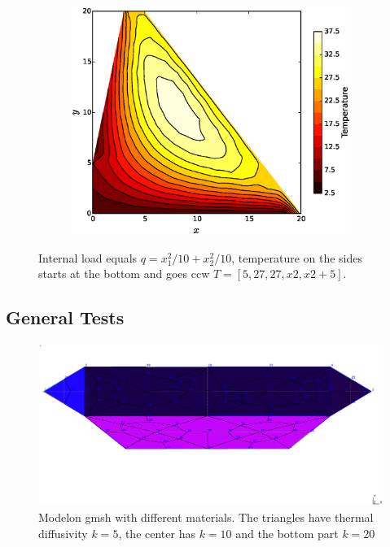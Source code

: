 \documentclass[10pt, a4paper]{article}
\begin{document}
\begin{figure}[H]
	\begin{subfigure}[H]{0.33\textwidth}
		\includegraphics[width=\textwidth]{fig/exdam4_3.eps}
		\caption{}
		\label{fig:3}
	\end{subfigure}
	\caption{Internal load equals $q=x_1^2/10 + x_2^2/10$, temperature on the sides starts at the bottom and goes ccw $T=[5, 27, 27, x2, x2+5]$.}
	\label{fig:3_1}
\end{figure}


\subsection{General Tests}

\begin{figure}[H]
\centering
\includegraphics[width=.6\textwidth]{fig/test3_4.eps}
\caption{Modelon gmsh with different materials. The triangles have thermal diffusivity $k=5$, the center has $k=10$ and the bottom part $k=20$}
\end{figure}
\end{document}
